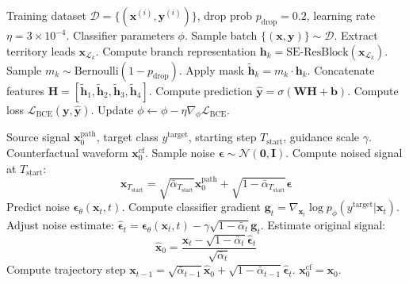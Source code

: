 \documentclass[5p,twocolumn,10pt]{elsarticle}
\begin{document}
\begin{algorithm}[t]
\caption{Anatomical Territory-Dropout Classifier Training}
\label{alg:classifier_training}
\begin{algorithmic}[1]
\REQUIRE Training dataset $\mathcal{D} = \{(\mathbf{x}^{(i)}, \mathbf{y}^{(i)})\}$, drop prob $p_{\text{drop}} = 0.2$, learning rate $\eta = 3\times 10^{-4}$.
\ENSURE Classifier parameters $\phi$.
    \STATE Sample batch $\{(\mathbf{x}, \mathbf{y})\} \sim \mathcal{D}$.
        \STATE Extract territory leads $\mathbf{x}_{\mathcal{L}_k}$.
        \STATE Compute branch representation $\mathbf{h}_k = \text{SE-ResBlock}(\mathbf{x}_{\mathcal{L}_k})$.
        \STATE Sample $m_k \sim \text{Bernoulli}(1 - p_{\text{drop}})$.
        \STATE Apply mask $\tilde{\mathbf{h}}_k = m_k \cdot \mathbf{h}_k$.
    \ENDFOR
    \STATE Concatenate features $\mathbf{H} = [\tilde{\mathbf{h}}_1, \tilde{\mathbf{h}}_2, \tilde{\mathbf{h}}_3, \tilde{\mathbf{h}}_4]$.
    \STATE Compute prediction $\hat{\mathbf{y}} = \sigma(\mathbf{W} \mathbf{H} + \mathbf{b})$.
    \STATE Compute loss $\mathcal{L}_{\text{BCE}}(\mathbf{y}, \hat{\mathbf{y}})$.
    \STATE Update $\phi \leftarrow \phi - \eta \nabla_\phi \mathcal{L}_{\text{BCE}}$.
\ENDWHILE
\end{algorithmic}
\end{algorithm}

\begin{algorithm}[t]
\caption{Guided DDIM Counterfactual Inference}
\label{alg:ddim_sampling}
\begin{algorithmic}[1]
\REQUIRE Source signal $\mathbf{x}_0^{\text{path}}$, target class $y^{\text{target}}$, starting step $T_{\text{start}}$, guidance scale $\gamma$.
\ENSURE Counterfactual waveform $\mathbf{x}^{\text{cf}}_0$.
\STATE Sample noise $\mathbf{\epsilon} \sim \mathcal{N}(\mathbf{0}, \mathbf{I})$.
\STATE Compute noised signal at $T_{\text{start}}$:
       $$\mathbf{x}_{T_{\text{start}}} = \sqrt{\bar{\alpha}_{T_{\text{start}}}} \mathbf{x}_0^{\text{path}} + \sqrt{1 - \bar{\alpha}_{T_{\text{start}}}} \mathbf{\epsilon}$$
    \STATE Predict noise $\mathbf{\epsilon}_\theta(\mathbf{x}_t, t)$.
    \STATE Compute classifier gradient $\mathbf{g}_t = \nabla_{\mathbf{x}_t} \log p_\phi(y^{\text{target}} | \mathbf{x}_t)$.
    \STATE Adjust noise estimate: $\hat{\mathbf{\epsilon}}_t = \mathbf{\epsilon}_\theta(\mathbf{x}_t, t) - \gamma \sqrt{1 - \bar{\alpha}_t} \mathbf{g}_t$.
    \STATE Estimate original signal:
           $$\hat{\mathbf{x}}_0 = \frac{\mathbf{x}_t - \sqrt{1 - \bar{\alpha}_t} \hat{\mathbf{\epsilon}}_t}{\sqrt{\bar{\alpha}_t}}$$
    \STATE Compute trajectory step $\mathbf{x}_{t-1} = \sqrt{\bar{\alpha}_{t-1}} \hat{\mathbf{x}}_0 + \sqrt{1 - \bar{\alpha}_{t-1}} \hat{\mathbf{\epsilon}}_t$.
\ENDFOR
\RETURN $\mathbf{x}_0^{\text{cf}} = \mathbf{x}_0$.
\end{algorithmic}
\end{algorithm}
\end{document}
